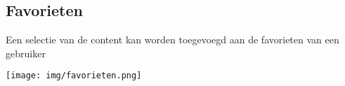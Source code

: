 \subsection{Favorieten}\label{favorieten}

Een selectie van de content kan worden toegevoegd aan de favorieten van een gebruiker

\begin{center}
	\texttt{[image: img/favorieten.png]}
\end{center}